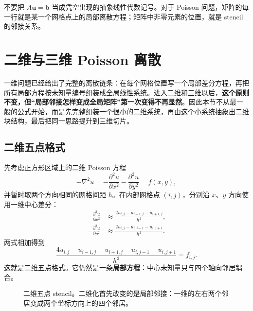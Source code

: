 \begin{keybox}
不要把 $A\bm u=\bm b$ 当成凭空出现的抽象线性代数记号。对于 Poisson 问题，矩阵的每一行就是某一个网格点上的局部离散方程；矩阵中非零元素的位置，就是 stencil 的邻接关系。
\end{keybox}

\section{二维与三维 Poisson 离散}

一维问题已经给出了完整的离散链条：在每个网格位置写一个局部差分方程，再把所有局部方程按未知量编号组装成全局线性系统。进入二维和三维以后，\textbf{这个原则不变，但“局部邻接怎样变成全局矩阵”第一次变得不再显然}。因此本节不从最一般的公式开始，而是先完整组装一个很小的二维系统，再由这个小系统抽象出二维块结构，最后把同一思路提升到三维切片。

\subsection{二维五点格式}

先考虑正方形区域上的二维 Poisson 方程
\begin{equation}
-\nabla^2u
=-\frac{\partial^2u}{\partial x^2}
 -\frac{\partial^2u}{\partial y^2}
=f(x,y),
\end{equation}
并暂时取两个方向相同的网格间距 $h$。在内部网格点 $(i,j)$，分别沿 $x$、$y$ 方向使用一维中心差分：
\begin{align}
-\frac{\partial^2u}{\partial x^2}
&\approx \frac{2u_{i,j}-u_{i-1,j}-u_{i+1,j}}{h^2},\\
-\frac{\partial^2u}{\partial y^2}
&\approx \frac{2u_{i,j}-u_{i,j-1}-u_{i,j+1}}{h^2}.
\end{align}
两式相加得到
\begin{equation}
\boxed{
\frac{
4u_{i,j}-u_{i-1,j}-u_{i+1,j}-u_{i,j-1}-u_{i,j+1}
}{h^2}
=f_{i,j}.
}
\label{eq:discretization-two-dimensional-five-point}
\end{equation}
这就是二维五点格式。它仍然是一条\textbf{局部方程}：中心未知量只与四个轴向邻居耦合。

\begin{figure}[htbp]
\centering
{}
\caption{二维五点 stencil。二维化首先改变的是局部邻接：一维的左右两个邻居变成两个坐标方向上的四个邻居。}
\label{fig:discretization-five-point-stencil}
\end{figure}

